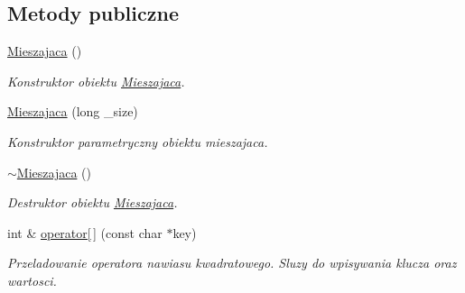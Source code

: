\subsection*{Metody publiczne}
\begin{DoxyCompactItemize}
\item 
\hyperlink{class_mieszajaca_ab500c9ba068fbe15f9aa05d83df500ed}{Mieszajaca} ()
\begin{DoxyCompactList}\small\item\em Konstruktor obiektu \hyperlink{class_mieszajaca}{Mieszajaca}. \end{DoxyCompactList}\item 
\hyperlink{class_mieszajaca_a057f62fac3404b4748b4b38dbfc25cc2}{Mieszajaca} (long \-\_\-size)
\begin{DoxyCompactList}\small\item\em Konstruktor parametryczny obiektu mieszajaca. \end{DoxyCompactList}\item 
\hyperlink{class_mieszajaca_a66a712ce4807c9330ae36f6561101a57}{$\sim$\-Mieszajaca} ()
\begin{DoxyCompactList}\small\item\em Destruktor obiektu \hyperlink{class_mieszajaca}{Mieszajaca}. \end{DoxyCompactList}\item 
int \& \hyperlink{class_mieszajaca_ad2a90e2facd4df39cd1efe8a75ce60a4}{operator\mbox{[}$\,$\mbox{]}} (const char $\ast$key)
\begin{DoxyCompactList}\small\item\em Przeladowanie operatora nawiasu kwadratowego. Sluzy do wpisywania klucza oraz wartosci. \end{DoxyCompactList}\end{DoxyCompactItemize}
